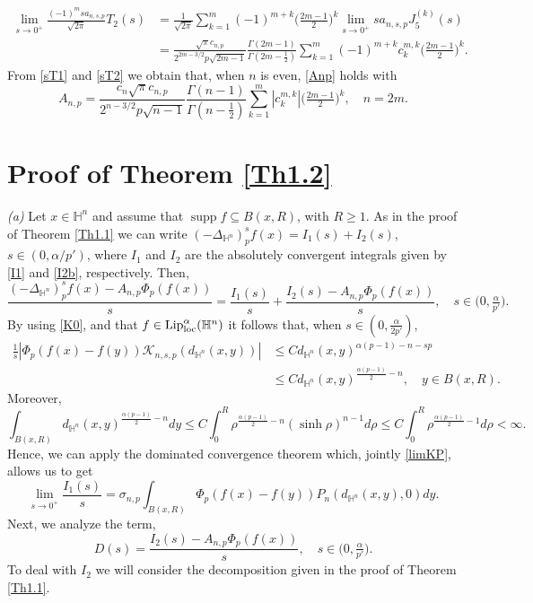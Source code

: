 \documentclass[a4paper,10pt, reqno]{amsart}
\theoremstyle{definition}
\theoremstyle{remark}
\newcommand{\supp}{\mathop{\mathrm{supp}}}
\numberwithin{equation}{section}
\begin{document}
{\begin{align}
\lim_{s\rightarrow 0^+}\frac{(-1)^msa_{n,s,p}}{\sqrt{2\pi}}T_2(s)&=\frac{1}{\sqrt{2\pi}}\sum_{k=1}^m(-1)^{m+k}\big(\tfrac{2m-1}{2}\big)^k\lim_{s\rightarrow 0^+}sa_{n,s,p}J^{(k)}_5(s)\nonumber\\
&=\frac{\sqrt{\pi }c_{n,p}}{2^{2m-3/2}p\sqrt{2m-1}}\frac{\Gamma (2m-1)}{\Gamma (2m-\frac{1}{2})}\sum_{k=1}^m(-1)^{m+k}c_k^{m,k}\big(\tfrac{2m-1}{2}\big)^k.
\end{align}
From \eqref{sT1} and \eqref{sT2} we obtain that, when $n$ is even, \eqref{Anp} holds with
\begin{equation}\label{Aneven}
A_{n,p}=\frac{c_n\sqrt{\pi }c_{n,p}}{2^{n-3/2}p\sqrt{n-1}}\frac{\Gamma (n-1)}{\Gamma (n-\frac{1}{2})}\sum_{k=1}^m|c_k^{m,k}|\big(\tfrac{2m-1}{2}\big)^k,\quad n=2m.
\end{equation}


\section{Proof of Theorem \ref{Th1.2}}\label{S4}

{\it (a)} Let $x\in \mathbb H^n$ and assume that $\supp f\subseteq B(x,R)$, with $R\geq 1$. As in the proof of Theorem \ref{Th1.1} we can write
$(-\Delta_{\mathbb H^n})_p^sf(x)=I_1(s)+I_2(s)$, $s\in (0,\alpha /p')$, where $I_1$ and $I_2$ are the absolutely convergent integrals given by \eqref{I1} and \eqref{I2b}, respectively. Then,
\begin{equation}\label{cocloga}
\frac{(-\Delta_{\mathbb H^n})_p^sf(x)-A_{n,p}\Phi _p(f(x))}{s}=\frac{I_1(s)}{s}+\frac{I_2(s)-A_{n,p}\Phi _p(f(x))}{s},\quad s\in \big(0,\tfrac{\alpha}{p'}\big).
\end{equation}
By using \eqref{K0}, and that $f\in {\rm Lip}_{\rm loc}^\alpha (\mathbb H^n)$ it follows that, when $s\in (0,\tfrac{\alpha}{2p'})$, 
\begin{align*}
\frac{1}{s}|\Phi _p(f(x)-f(y))\mathcal K_{n,s,p}(d_{\mathbb H^n}(x,y))|&\leq Cd_{\mathbb H^n}(x,y)^{\alpha(p-1)-n-sp}\\
&\leq C d_{\mathbb H^n}(x,y)^{\frac{\alpha(p-1)}{2}-n},\quad y\in B(x,R).
\end{align*}
Moreover,
$$
\int_{B(x,R)}d_{\mathbb H^n}(x,y)^{\frac{\alpha(p-1)}{2}-n}dy\leq C\int_0^R\rho ^{\frac{\alpha(p-1)}{2}-n}(\sinh \rho )^{n-1}d\rho \leq C\int_0^R\rho ^{\frac{\alpha(p-1)}{2}-1}d\rho <\infty.
$$
Hence, we can apply the dominated convergence theorem which, jointly \eqref{limKP}, allows us to get
\begin{equation}\label{limI1s}
\lim_{s\rightarrow 0^+}\frac{I_1(s)}{s}=\sigma_{n,p}\int_{B(x,R)}\Phi _p(f(x)-f(y))P_n(d_{\mathbb H^n}(x,y) ,0)dy.
\end{equation}
Next, we analyze the term,
$$
D(s)=\frac{I_2(s)-A_{n,p}\Phi _p(f(x))}{s},\quad s\in \big(0,\tfrac{\alpha}{p'}\big).
$$
To deal with $I_2$ we will consider the decomposition given in the proof of Theorem \ref{Th1.1}. 

}
\end{document}
